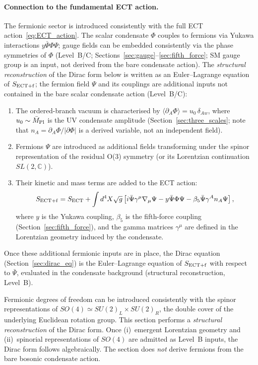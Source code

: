 \documentclass[11pt,a4paper]{article}
\numberwithin{equation}{section}
\begin{document}
\paragraph{Connection to the fundamental ECT action.}
The fermionic sector is introduced consistently with the full ECT
action~\eqref{eq:ECT_action}.  The scalar condensate $\Phi$ couples
to fermions via Yukawa interactions $y\bar\Psi\Phi\Psi$; gauge fields
can be embedded consistently via the phase symmetries of $\Phi$
(Level~B/C; Sections~\ref{sec:gauge}--\ref{sec:fifth_force};
SM gauge group is an input, not derived from the bare condensate action).
The \emph{structural reconstruction} of the Dirac form below is written
as an Euler--Lagrange equation of $S_{\rm ECT+f}$;
the fermion field $\Psi$ and its couplings are additional
inputs not contained in the bare scalar condensate action (Level~B/C):
\begin{enumerate}
\item The ordered-branch vacuum is characterised by
$\langle\partial_A\Phi\rangle=u_0\,\delta_{Aw}$,
where $u_0\sim\bar{M}_{\rm Pl}$ is the UV condensate amplitude
(Section~\ref{sec:three_scales}; note that $n_A=\partial_A\Phi/|\partial\Phi|$
is a derived variable, not an independent field).
\item Fermions $\Psi$ are introduced as additional fields transforming
under the spinor representation of the residual O(3) symmetry
(or its Lorentzian continuation $SL(2,\mathbb{C})$).
\item Their kinetic and mass terms are added to the ECT action:
\begin{equation}
\label{eq:S_fermion}
S_{\rm ECT+f} = S_{\rm ECT} + \int d^4X\sqrt{g}\left[
i\bar\Psi\gamma^\mu\nabla_\mu\Psi - y\bar\Psi\Phi\Psi
- \beta_5\bar\Psi\gamma^A n_A\Psi
\right],
\end{equation}
where $y$ is the Yukawa coupling, $\beta_5$ is the fifth-force
coupling (Section~\ref{sec:fifth_force}), and the gamma matrices
$\gamma^\mu$ are defined in the Lorentzian geometry induced by the
condensate.
\end{enumerate}
Once these additional fermionic inputs are in place,
the Dirac equation (Section~\ref{sec:dirac_eq}) is the
Euler--Lagrange equation of $S_{\rm ECT+f}$ with respect to
$\bar\Psi$, evaluated in the condensate background
(structural reconstruction, Level~B).

Fermionic degrees of freedom can be introduced consistently with
the spinor representations of $SO(4)\simeq SU(2)_L\times SU(2)_R$,
the double cover of the underlying Euclidean rotation group.
This section performs a \emph{structural reconstruction} of the Dirac form.
Once (i)~emergent Lorentzian geometry and (ii)~spinorial representations of
$SO(4)$ are admitted as Level~B inputs, the Dirac form follows algebraically.
The section does \emph{not} derive fermions from the bare bosonic condensate action.
\end{document}
